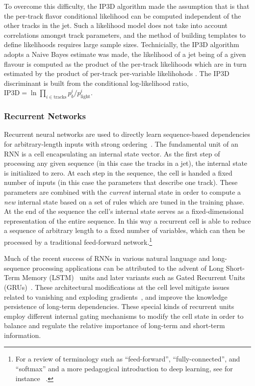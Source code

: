 To overcome this difficulty, the IP3D algorithm made the assumption that is that the per-track flavor conditional likelihood can be computed independent of the other tracks in the jet.  Such a likelihood model does not take into account correlations amongst track parameters, and the method of building templates to define likelihoods requires large sample sizes. Technicially, the IP3D algorithm adopts a Naive Bayes estimate was made, the likelihood of a jet being of a given flavour is computed as the product of the per-track likelihoods which are in turn estimated by the product of per-track per-variable likelihohods . The IP3D discriminant is built from the conditional log-likelihood ratio, $\textrm{IP3D}=\ln \prod_{i \in \textrm{tracks}} p_b^i / p_{\textrm{light}}^i$. 

\subsubsection{Recurrent Networks}

Recurrent neural networks are used to directly learn sequence-based dependencies for arbitrary-length inputs with strong ordering~\cite{ref:RNNthesis, dlbook}. The fundamental unit of an RNN is a cell encapsulating an internal state vector. As the first step of processing any given sequence (in this case the tracks in a jet), the internal state is initialized to zero. At each step in the sequence, the cell is handed a fixed number of inputs (in this case the parameters that describe one track). These parameters are combined with the \emph{current} internal state in order to compute a \emph{new} internal state based on a set of rules which are tuned in the training phase. At the end of the sequence the cell's internal state serves as a fixed-dimensional representation of the entire sequence. In this way a recurrent cell is able to reduce a sequence of arbitrary length to a fixed number of variables, which can then be processed by a traditional feed-forward network.\footnote{For a review of terminology such as ``feed-forward'', ``fully-connected'', and ``softmax'' and a more pedagogical introduction to deep learning, see for instance ~\cite{dlbook,2014arXiv1404.7828S}.}

Much of the recent success of RNNs in various natural language and long-sequence processing applications can be attributed to the advent of Long Short-Term Memory (LSTM)~\cite{ref:LSTM} units and later variants such as Gated Recurrent Units (GRUs)~\cite{ref:GRU,cho14}. These architectural modifications at the cell level mitigate issues related to vanishing and exploding gradients~\cite{hochreiter1991untersuchungen,Bengio:1994:LLD:2325857.2328340,DBLP:journals/corr/abs-1211-5063}, and improve the knowledge persistence of long-term dependencies. These special kinds of recurrent units employ different internal gating mechanisms to modify the cell state in order to balance and regulate the relative importance of long-term and short-term information.
